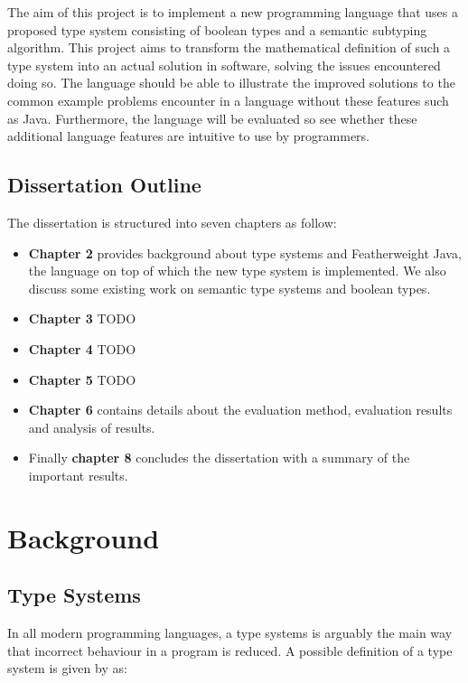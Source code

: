 \documentclass{l4proj}
\begin{document}
The aim of this project is to implement a new programming language that uses a proposed type system consisting of boolean types and a semantic subtyping algorithm. This project aims to transform the mathematical definition of such a type system into an actual solution in software, solving the issues encountered doing so. The language should be able to illustrate the improved solutions to the
common example problems encounter in a language without these features such as Java. Furthermore, the language will be evaluated so see whether these additional language features are intuitive to use by programmers.

\section{Dissertation Outline}

The dissertation is structured into seven chapters as follow:

\begin{itemize}
    \item
          \textbf{Chapter 2} provides background about type systems and Featherweight Java, the language on top of which the new type system is implemented. We also discuss some existing work on semantic type systems and boolean types.
    \item
          \textbf{Chapter 3} TODO
    \item
          \textbf{Chapter 4} TODO
    \item
          \textbf{Chapter 5} TODO
    \item
          \textbf{Chapter 6} contains details about the evaluation method, evaluation results and analysis of results.
    \item
          Finally \textbf{chapter 8} concludes the dissertation with a summary of the important results.
\end{itemize}


\chapter{Background}


\section{Type Systems}

In all modern programming languages, a type systems is arguably the main way that incorrect behaviour in a program is reduced.
A possible definition of a type system is given by \citet{Pierce2002} as:
\end{document}
